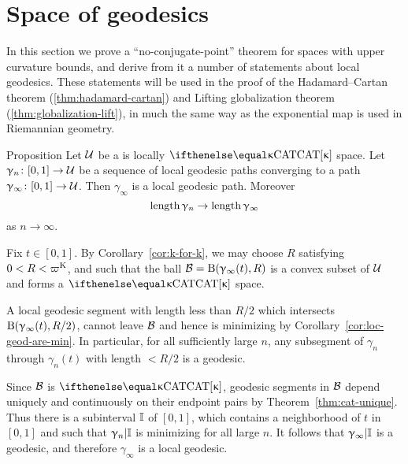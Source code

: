 
\section{Space of geodesics}\label{sec:geod-space}

In this section we prove a  ``no-conjugate-point'' theorem for spaces with upper curvature bounds, and derive from it a number of statements about
local geodesics.  These statements will be used in the proof of the Hadamard--Cartan theorem (\ref{thm:hadamard-cartan}) and Lifting
 globalization theorem (\ref{thm:globalization-lift}), in much the same way as  the exponential map is used in Riemannian geometry.

\begin{thm}{Proposition}\label{prop:geo-complete}
Let $\mathcal{U}$ be a is locally $\CAT\kappa$ space.
 Let $\gamma_n\:[0,1]\to\spc{U}$ be a sequence of local geodesic paths converging to a path $\gamma_\infty\:[0,1]\to\spc{U}$.
Then $\gamma_\infty$ is a local geodesic path.
Moreover 
\[\length\gamma_n\to\length\gamma_\infty\]
as $n\to\infty$.
\end{thm}

Fix $t\in[0,1]$.
By Corollary~\ref{cor:k-for-k}, we may choose $R$ satisfying $0<R<\varpi\Kappa$,
and such that
the ball $\mathcal{B}=\mathrm{B}{}(\upgamma_\infty(t),R)$ is a convex subset of $\mathcal{U}$ and forms a $\CAT\kappa$ space.



A local geodesic segment  with length less than $R/2$ which intersects $\mathrm{B}{}(\upgamma_\infty(t),R/2)$, cannot leave $\mathcal{B}$ and hence  is  minimizing by Corollary~\ref{cor:loc-geod-are-min}.  In particular, for all sufficiently large $n$, any subsegment  of $\gamma_n$ through $\gamma_n(t)$  with length $<R/2$ is a geodesic.


Since $\mathcal{B}$ is $\CAT\kappa$, geodesic segments in $\mathcal{B}$ depend uniquely and continuously on their endpoint pairs by Theorem~\ref{thm:cat-unique}.  
Thus there is a subinterval $\mathbb{I}$ of $[0,1]$,
which contains a neighborhood of $t$ in $[0,1]$
and such that $\upgamma_n|\mathbb{I}$ is minimizing for all large $n$.
It follows that $\upgamma_\infty|\mathbb{I}$ is a geodesic,
and therefore $\gamma_\infty$ is a local geodesic.
\qeds



